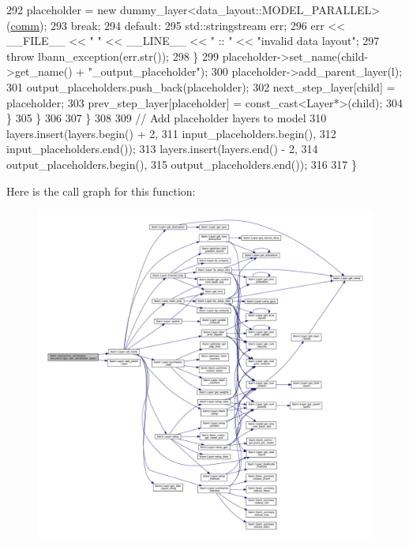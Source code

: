 \begin{DoxyCode}
292           placeholder = \textcolor{keyword}{new} dummy\_layer<data\_layout::MODEL\_PARALLEL>(\hyperlink{file__io_8cpp_ab048c6f9fcbcfaa57ce68b00263dbebe}{comm});
293           \textcolor{keywordflow}{break};
294         \textcolor{keywordflow}{default}:
295           std::stringstream err;
296           err << \_\_FILE\_\_ << \textcolor{stringliteral}{" "} << \_\_LINE\_\_ << \textcolor{stringliteral}{" :: "} << \textcolor{stringliteral}{"invalid data layout"};
297           \textcolor{keywordflow}{throw} lbann\_exception(err.str());
298         \}
299         placeholder->set\_name(child->get\_name() + \textcolor{stringliteral}{"\_output\_placeholder"});
300         placeholder->add\_parent\_layer(l);
301         output\_placeholders.push\_back(placeholder);
302         next\_step\_layer[child] = placeholder;
303         prev\_step\_layer[placeholder] = \textcolor{keyword}{const\_cast<}Layer*\textcolor{keyword}{>}(child);
304       \}
305     \}
306     
307   \}
308 
309   \textcolor{comment}{// Add placeholder layers to model}
310   layers.insert(layers.begin() + 2,
311                 input\_placeholders.begin(),
312                 input\_placeholders.end());
313   layers.insert(layers.end() - 2,
314                 output\_placeholders.begin(),
315                 output\_placeholders.end());
316 
317 \}
\end{DoxyCode}
Here is the call graph for this function\+:\nopagebreak
\begin{figure}[H]
\begin{center}
\leavevmode
\includegraphics[width=350pt]{namespacelbann_1_1anonymous__namespace_02recurrent_8cpp_03_a50bca1c07c6f3146947b2a0fb5cc815a_cgraph}
\end{center}
\end{figure}
